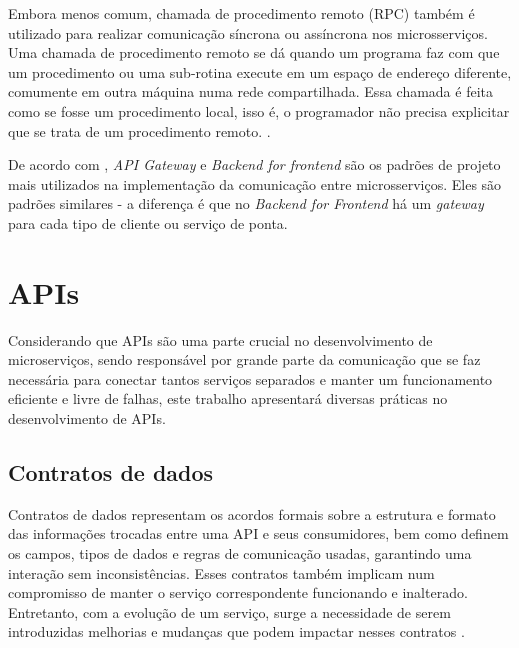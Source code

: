 Embora menos comum, chamada de procedimento remoto (RPC) também é utilizado para realizar comunicação síncrona ou assíncrona nos microsserviços. Uma chamada de procedimento remoto se dá quando um programa faz com que um procedimento ou uma sub-rotina execute em um espaço de endereço diferente, comumente em outra máquina numa rede compartilhada. Essa chamada é feita como se fosse um procedimento local, isso é, o programador não precisa explicitar que se trata de um procedimento remoto. \cite{microsoft-grpc}.

De acordo com , \emph{API Gateway} e \emph{Backend for frontend} são os padrões de projeto mais utilizados na implementação da comunicação entre microsserviços. Eles são padrões similares - a diferença é que no \emph{Backend for Frontend} há um \emph{gateway} para cada tipo de cliente ou serviço de ponta.



\section{APIs}\label{boas-praticas-apis}

Considerando que APIs são uma parte crucial no desenvolvimento de microserviços, sendo responsável por grande parte da comunicação que se faz necessária para conectar tantos serviços separados e manter um funcionamento eficiente e livre de falhas, este trabalho apresentará diversas práticas no desenvolvimento de APIs.

\subsection{Contratos de dados}\label{subsecao-contratos-de-dados}
Contratos de dados representam os acordos formais sobre a estrutura e formato das informações trocadas entre uma API e seus consumidores, bem como definem os campos, tipos de dados e regras de comunicação usadas, garantindo uma interação sem inconsistências. Esses contratos também implicam num compromisso de manter o serviço correspondente funcionando e inalterado. Entretanto, com a evolução de um serviço, surge a necessidade de serem introduzidas melhorias e mudanças que podem impactar nesses contratos \cite{martin-fowler-microservices}.

